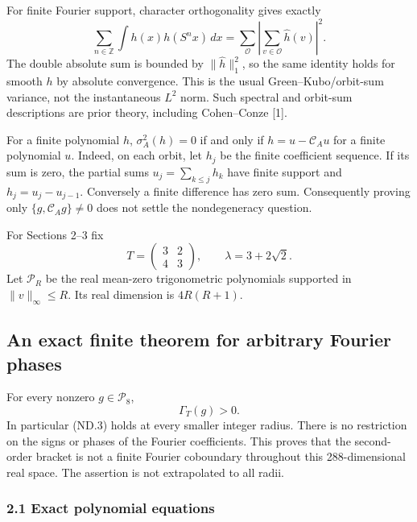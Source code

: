 For finite Fourier support, character orthogonality gives exactly \[
 \sum_{n\in\mathbb Z}\int h(x)h(S^n x)\,dx
   =\sum_{\mathcal O}\left|\sum_{v\in\mathcal O}\widehat h(v)\right|^2.
 \tag{ND.2}
\] The double absolute sum is bounded by \(\|\widehat h\|_1^2\), so the same identity holds for smooth \(h\) by absolute convergence. This is the usual Green--Kubo/orbit-sum variance, not the instantaneous \(L^2\) norm. Such spectral and orbit-sum descriptions are prior theory, including Cohen--Conze {[}1{]}.

For a finite polynomial \(h\), \(\sigma_A^2(h)=0\) if and only if \(h=u-\mathcal C_Au\) for a finite polynomial \(u\). Indeed, on each orbit, let \(h_j\) be the finite coefficient sequence. If its sum is zero, the partial sums \(u_j=\sum_{k\leq j}h_k\) have finite support and \(h_j=u_j-u_{j-1}\). Conversely a finite difference has zero sum. Consequently proving only \(\{g,\mathcal C_Ag\}\ne0\) does not settle the nondegeneracy question.

For Sections 2--3 fix \[
 T=\begin{pmatrix}3&2\\4&3\end{pmatrix},\qquad
 \lambda=3+2\sqrt2.
\] Let \(\mathcal P_R\) be the real mean-zero trigonometric polynomials supported in \(\|v\|_\infty\leq R\). Its real dimension is \(4R(R+1)\).

\subsection{An exact finite theorem for arbitrary Fourier phases}\label{nondegeneracy:an-exact-finite-theorem-for-arbitrary-fourier-phases}

\begin{theorem}\label{pass1:ch10_resonance_rigidity-1} For every nonzero \(g\in\mathcal P_8\), \[
                         \boxed{\Gamma_T(g)>0.}             \tag{ND.3}
\] In particular (ND.3) holds at every smaller integer radius. There is no restriction on the signs or phases of the Fourier coefficients. This proves that the second-order bracket is not a finite Fourier coboundary throughout this 288-dimensional real space. The assertion is not extrapolated to all radii.
\end{theorem}

\subsubsection{2.1 Exact polynomial equations}\label{nondegeneracy:exact-polynomial-equations}

